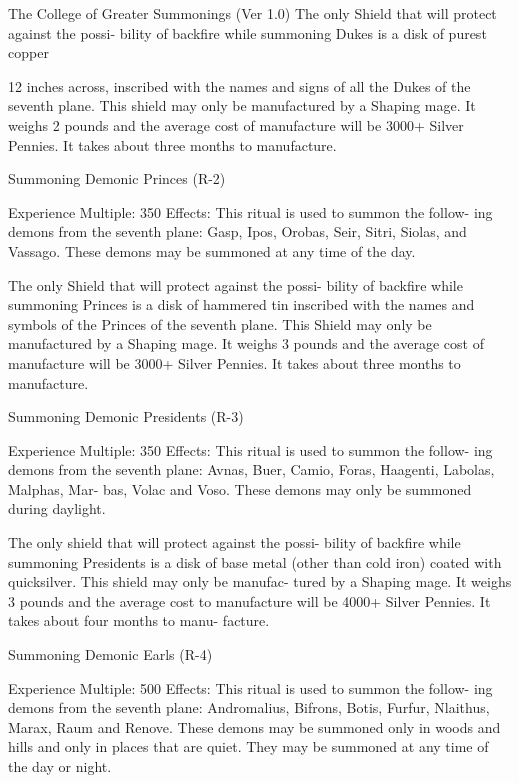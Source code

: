 \begin{Chapter}{The College of Greater Summonings (Ver 1.0)}
The only Shield that will protect against the possi-
bility of backfire while summoning Dukes is a disk 
of purest copper 

12  inches  across,  inscribed  with  the  names  and 
signs  of  all  the  Dukes  of  the  seventh  plane.  This 
shield  may  only  be  manufactured  by  a  Shaping 
mage.  It  weighs  2  pounds  and  the  average  cost  of 
manufacture will be 3000+ Silver Pennies. It takes 
about three months to manufacture. 

Summoning Demonic Princes (R-2) 

Experience Multiple: 350 
Effects:  This  ritual  is  used  to  summon  the  follow-
ing  demons  from  the  seventh  plane:  Gasp,  Ipos, 
Orobas,  Seir,  Sitri,  Siolas,  and  Vassago.  These 
demons may be summoned at any time of the day. 

The only Shield that will protect against the possi-
bility  of  backfire  while  summoning  Princes  is  a 
disk of hammered tin inscribed with the names and 
symbols  of  the  Princes  of  the  seventh  plane.  This 
Shield  may  only  be  manufactured  by  a  Shaping 
mage.  It  weighs  3  pounds  and  the  average  cost  of 
manufacture will be 3000+ Silver Pennies. It takes 
about three months to manufacture. 

Summoning Demonic Presidents (R-3) 

Experience Multiple: 350 
Effects:  This  ritual  is  used  to  summon  the  follow-
ing  demons  from  the  seventh  plane:  Avnas,  Buer, 
Camio,  Foras,  Haagenti,  Labolas,  Malphas,  Mar-
bas,  Volac  and  Voso.  These  demons  may  only  be 
summoned during daylight. 

The only shield that will protect against the possi-
bility of backfire while summoning Presidents is a 
disk  of  base  metal  (other  than  cold  iron)  coated 
with quicksilver. This shield may only be manufac-
tured  by  a  Shaping  mage.  It  weighs  3  pounds  and 
the  average  cost  to  manufacture  will  be  4000+ 
Silver Pennies. It takes about four months to manu-
facture. 

Summoning Demonic Earls (R-4) 

Experience Multiple: 500 
Effects:  This  ritual  is  used  to  summon  the  follow-
ing  demons  from  the  seventh  plane:  Andromalius, 
Bifrons, Botis, Furfur, Nlaithus, Marax, Raum and 
Renove. These demons may be summoned only in 
woods  and  hills  and  only  in  places  that  are  quiet. 
They may be summoned at any time of the day or 
night. 


\end{Chapter}
